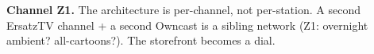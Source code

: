 \documentclass[fontpath=fonts/,logopath=logo/]{riposte-doc}
\begin{document}

\begin{ripbullets}
\item \textbf{Channel Z1.} The architecture is per-channel, not per-station. A second ErsatzTV channel + a second Owncast is a sibling network (Z1: overnight ambient? all-cartoons?). The storefront becomes a dial.
\end{ripbullets}

\ripdashrule


\ripend
\end{document}
